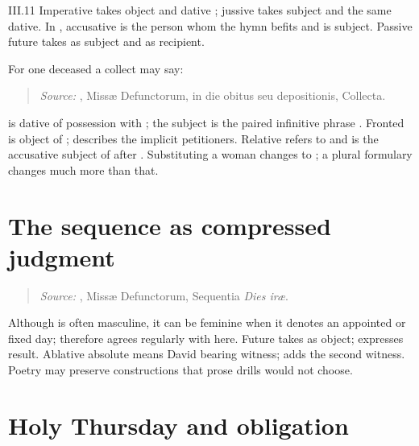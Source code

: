 \begin{courseunit}{III.11}
Imperative  takes object  and dative
; jussive  takes subject  and the
same dative. In , accusative  is the person
whom the hymn befits and  is subject. Passive future
 takes  as subject and  as recipient.

For one deceased a collect may say:
\begin{quote}

\emph{Source:} \Missal, Missæ Defunctorum, in die obitus seu depositionis,
Collecta.
\end{quote}
 is dative of possession with ; the subject is
the paired infinitive phrase . Fronted
 is object of ;  describes the
implicit petitioners. Relative  refers to  and is the
accusative subject of  after . Substituting a
woman changes  to ; a plural formulary changes much
more than that.

\section{The sequence as compressed judgment}

\begin{quote}

\emph{Source:} \Missal, Missæ Defunctorum, Sequentia \emph{Dies iræ}.
\end{quote}

Although  is often masculine, it can be feminine when it denotes
an appointed or fixed day;  therefore agrees regularly with
 here. Future  takes  as object;
 expresses result. Ablative absolute
 means David bearing witness;  adds the
second witness. Poetry may preserve constructions that prose drills would not
choose.

\section{Holy Thursday and obligation}


\end{courseunit}
